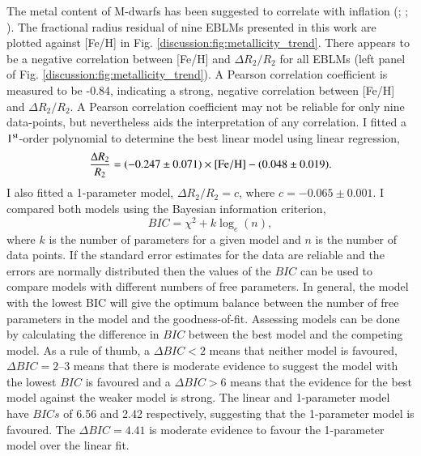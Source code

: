 The metal content of M-dwarfs has been suggested to correlate with inflation (\citealt{2014ApJ...789...53F}; \citealt{2016A&A...593A..99F}; \citealt{2009A&A...505..205D}). 
The fractional radius residual of nine EBLMs presented in this work are plotted against [Fe/H] in Fig. \ref{discussion:fig:metallicity_trend}. There appears to be a negative correlation between [Fe/H] and $\Delta R_2 / R_2$ for all EBLMs (left panel of Fig. \ref{discussion:fig:metallicity_trend}). A Pearson correlation coefficient \citep{royal1895proceedings} is measured to be -0.84, indicating a strong, negative correlation between [Fe/H] and $\Delta R_2 / R_2$. A Pearson correlation coefficient may not be reliable for only nine data-points, but nevertheless aids the interpretation of any correlation. I fitted a $1^{\rm st}$-order polynomial to determine the best linear model using linear regression,
%
\begin{equation}
    \frac{\Delta R_2}{R_2} = (-0.247 \pm 0.071) \times \rm [Fe/H] - (0.048 \pm 0.019).
\end{equation}
%
I also fitted a 1-parameter model,  $\Delta R_2 / R_2 = c$, where $c = -0.065 \pm 0.001$. I compared both models using the Bayesian information criterion,
%
\begin{equation}
    BIC =  \chi^2 + k \log_e(n) ,
\end{equation}
%
where $k$ is the number of parameters for a given model and $n$ is the number of data points. If the standard error estimates for the data are reliable and the errors are normally distributed then the values of the $BIC$ can be used to compare models with different numbers of free parameters. In general, the model with the lowest BIC will give the optimum balance between the number of free parameters in the model and the goodness-of-fit. Assessing models can be done by calculating the difference in $BIC$ between the best model and the competing model. As a rule of thumb, a $\Delta BIC < 2$ means that neither model is favoured, $\Delta BIC = 2$--3 means that there is moderate evidence to suggest the model with the lowest $BIC$ is favoured and a $\Delta BIC > 6$ means that the evidence for the best model against the weaker model is strong. The linear and 1-parameter model have $BICs$ of 6.56 and 2.42 respectively, suggesting that the 1-parameter model is favoured. The $\Delta BIC = 4.41$ is moderate evidence to favour the 1-parameter model over the linear fit. 


